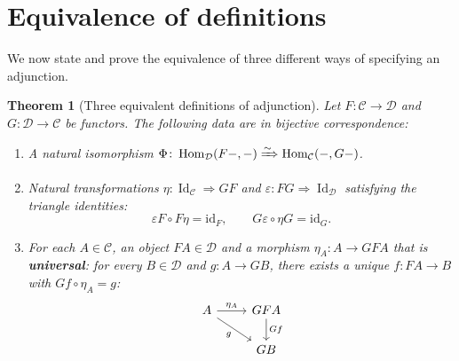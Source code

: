 \documentclass[a4paper,12pt]{book}
\DeclareMathOperator{\Hom}{Hom}
\DeclareMathOperator{\Id}{Id}
\newcommand{\id}{\mathrm{id}}
\theoremstyle{definition}
\theoremstyle{plain}
\newtheorem{theorem}[definition]{Theorem}
\theoremstyle{remark}
\begin{document}
\section{Equivalence of definitions}\label{sec:adj-equivalence}

We now state and prove the equivalence of three different ways
of specifying an adjunction.

\begin{theorem}[Three equivalent definitions of adjunction]%
\label{thm:adj-equiv-defs}
Let $F\colon\mathcal{C}\to\mathcal{D}$ and
$G\colon\mathcal{D}\to\mathcal{C}$ be functors.
The following data are in bijective correspondence:
\begin{enumerate}[label=\textbf{(\Alph*)}]
\item\label{item:adj-hom}
    A natural isomorphism
    $\Phi\colon\Hom_\mathcal{D}(F-,-)\xRightarrow{\sim}\Hom_\mathcal{C}(-,G-)$.

\item\label{item:adj-unit-counit}
    Natural transformations $\eta\colon\Id_\mathcal{C}\Rightarrow GF$
    and $\varepsilon\colon FG\Rightarrow\Id_\mathcal{D}$ satisfying
    the triangle identities:
    \[
        \varepsilon F\circ F\eta = \id_F,
        \qquad
        G\varepsilon\circ\eta G = \id_G.
    \]

\item\label{item:adj-universal}
    For each $A\in\mathcal{C}$, an object $FA\in\mathcal{D}$ and
    a morphism $\eta_A\colon A\to GFA$ that is \textbf{universal}:
    for every $B\in\mathcal{D}$ and $g\colon A\to GB$, there exists
    a unique $f\colon FA\to B$ with $Gf\circ\eta_A = g$:
    \[
    \begin{tikzcd}
    A \arrow[r, "\eta_A"] \arrow[dr, "g"'] & GFA \arrow[d, "Gf"] \\
    & GB
    \end{tikzcd}
    \]
\end{enumerate}
\end{theorem}
\end{document}
